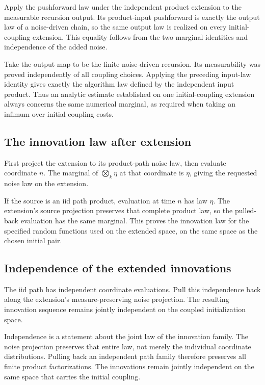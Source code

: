 \documentclass[11pt,a4paper]{article}
\begin{document}
Apply the pushforward law under the independent product extension to the measurable recursion output. Its product-input pushforward is exactly the output law of a noise-driven chain, so the same output law is realized on every initial-coupling extension. This equality follows from the two marginal identities and independence of the added noise.



Take the output map to be the finite noise-driven recursion. Its measurability was proved independently of all coupling choices. Applying the preceding input-law identity gives exactly the algorithm law defined by the independent input product. Thus an analytic estimate established on one initial-coupling extension always concerns the same numerical marginal, as required when taking an infimum over initial coupling costs.


\subsection{\texorpdfstring{The innovation law after extension}{The innovation law after extension}}


First project the extension to its product-path noise law, then evaluate coordinate \(n\). The marginal of \(\bigotimes_k\eta\) at that coordinate is \(\eta\), giving the requested noise law on the extension.



If the source is an iid path product, evaluation at time \(n\) has law \(\eta\). The extension's source projection preserves that complete product law, so the pulled-back evaluation has the same marginal. This proves the innovation law for the specified random functions used on the extended space, on the same space as the chosen initial pair.


\subsection{\texorpdfstring{Independence of the extended innovations}{Independence of the extended innovations}}


The iid path has independent coordinate evaluations. Pull this independence back along the extension's measure-preserving noise projection. The resulting innovation sequence remains jointly independent on the coupled initialization space.



Independence is a statement about the joint law of the innovation family. The noise projection preserves that entire law, not merely the individual coordinate distributions. Pulling back an independent path family therefore preserves all finite product factorizations. The innovations remain jointly independent on the same space that carries the initial coupling.
\end{document}
